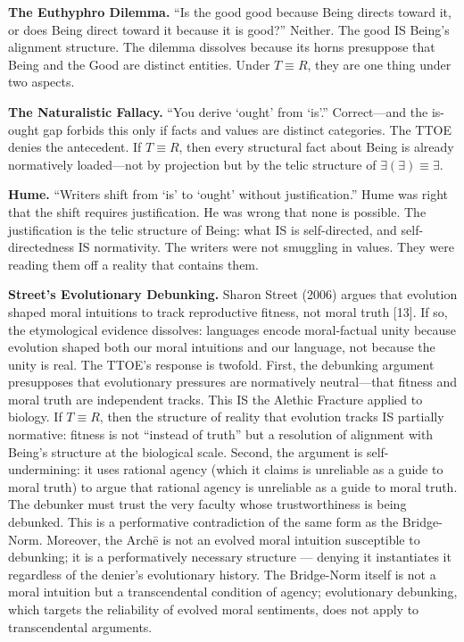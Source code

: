 \documentclass[12pt, letterpaper]{article}
\begin{document}
\textbf{The Euthyphro Dilemma.} ``Is the good good because Being directs toward it, or does Being direct toward it because it is good?'' Neither. The good IS Being's alignment structure. The dilemma dissolves because its horns presuppose that Being and the Good are distinct entities. Under $T \equiv R$, they are one thing under two aspects.

\textbf{The Naturalistic Fallacy.} ``You derive `ought' from `is'.'' Correct---and the is-ought gap forbids this only if facts and values are distinct categories. The TTOE denies the antecedent. If $T \equiv R$, then every structural fact about Being is already normatively loaded---not by projection but by the telic structure of $\exists(\exists) \equiv \exists$.

\textbf{Hume.} ``Writers shift from `is' to `ought' without justification.'' Hume was right that the shift requires justification. He was wrong that none is possible. The justification is the telic structure of Being: what IS is self-directed, and self-directedness IS normativity. The writers were not smuggling in values. They were reading them off a reality that contains them.

\textbf{Street's Evolutionary Debunking.} Sharon Street (2006) argues that evolution shaped moral intuitions to track reproductive fitness, not moral truth [13]. If so, the etymological evidence dissolves: languages encode moral-factual unity because evolution shaped both our moral intuitions and our language, not because the unity is real. The TTOE's response is twofold. First, the debunking argument presupposes that evolutionary pressures are normatively neutral---that fitness and moral truth are independent tracks. This IS the Alethic Fracture applied to biology. If $T \equiv R$, then the structure of reality that evolution tracks IS partially normative: fitness is not ``instead of truth'' but a resolution of alignment with Being's structure at the biological scale. Second, the argument is self-undermining: it uses rational agency (which it claims is unreliable as a guide to moral truth) to argue that rational agency is unreliable as a guide to moral truth. The debunker must trust the very faculty whose trustworthiness is being debunked. This is a performative contradiction of the same form as the Bridge-Norm. Moreover, the Arch\={e} is not an evolved moral intuition susceptible to debunking; it is a performatively necessary structure --- denying it instantiates it regardless of the denier's evolutionary history. The Bridge-Norm itself is not a moral intuition but a transcendental condition of agency; evolutionary debunking, which targets the reliability of evolved moral sentiments, does not apply to transcendental arguments.
\end{document}
